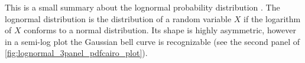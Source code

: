 This is a small summary about the lognormal probability distribution \citep[p.~780]{Bronstein2000}. The lognormal distribution is the distribution of a random variable $X$ if the logarithm of $X$ conforms to a normal distribution. Its shape is highly asymmetric, however in a semi-log plot the Gaussian bell curve is recognizable (see the second panel of \autoref{fig:lognormal_3panel_pdfcairo_plot}).
\begin{figure}[htb]
	\begin{floatrow}
	\end{floatrow}
\end{figure}
